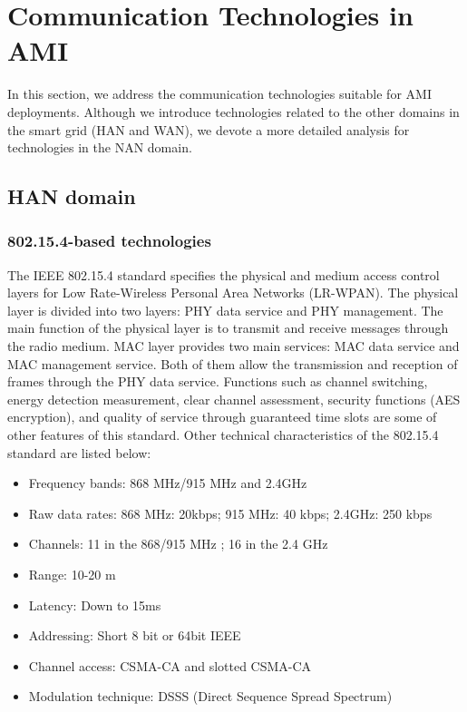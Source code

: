 \documentclass[11pt,draftclsnofoot,onecolumn]{IEEEtran}
\begin{document}
\section{Communication Technologies in AMI}\label{technologies}

In this section, we address the communication technologies suitable for AMI deployments. Although we introduce technologies related to the other domains in the smart grid (HAN and WAN), we devote a more detailed analysis for technologies in the NAN domain. 

\subsection{HAN domain}

\subsubsection{802.15.4-based technologies}\label{tech::802154}

The IEEE 802.15.4 standard specifies the physical and medium access control layers for Low Rate-Wireless Personal Area Networks (LR-WPAN). The physical layer is divided into two layers: PHY data service and PHY management. The main function of the physical  layer is to transmit and receive messages through the radio medium. MAC layer provides two main services: MAC data service and MAC management service. Both of them allow the transmission and reception of frames through the PHY data service. Functions such as channel switching, energy detection measurement, clear channel assessment, security functions (AES encryption), and quality of service through guaranteed time slots are some of other features of this standard. Other technical characteristics of the 802.15.4 standard are listed below:

\begin{itemize}
	\item Frequency bands: 868 MHz/915 MHz and 2.4GHz
	\item Raw data rates: 868 MHz: 20kbps; 915 MHz: 40 kbps; 2.4GHz: 250 kbps
	\item Channels: 11 in the 868/915 MHz ; 16 in the 2.4 GHz
	\item Range: 10-20 m
	\item Latency: Down to 15ms
	\item Addressing: Short  8 bit or 64bit IEEE
	\item Channel access: CSMA-CA and slotted CSMA-CA
	\item Modulation technique: DSSS (Direct Sequence Spread Spectrum)
\end{itemize}  
\end{document}

